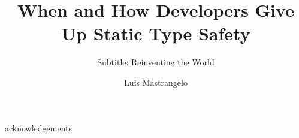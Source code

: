 \documentclass[]{usiinfthesis}
\title{When and How \lang{Java} Developers Give Up Static Type Safety} %
\subtitle{Subtitle: Reinventing the World} %
\author{Luis Mastrangelo} %
\begin{document}
\maketitle %

\frontmatter %



\begin{acknowledgements}

acknowledgements

\end{acknowledgements}

\tableofcontents 
\listoffigures %
\listoftables %

\mainmatter







\appendix %




\backmatter


%
%



\end{document}

